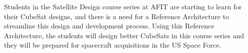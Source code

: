 

Students in the Satellite Design course series at AFIT are starting to learn  for their CubeSat designs, and there is a need for a Reference Architecture to streamline this design and development process. Using this Reference Architecture, the students will design better CubeSats in this course series and they will be prepared for spacecraft acquisitions in the US Space Force.